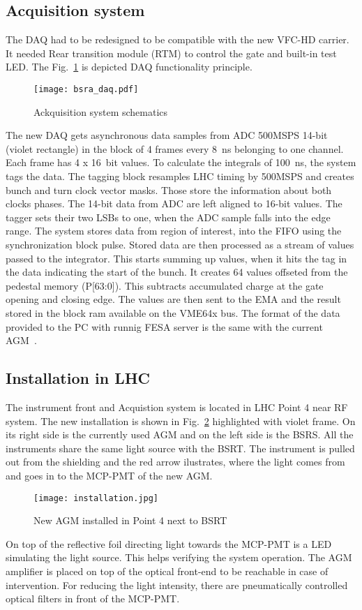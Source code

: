 \subsection{Acquisition system}
The DAQ had to be redesigned to be compatible with the new VFC-HD carrier. It
needed Rear transition module (RTM) to control the gate and built-in test LED.  
The Fig.~\ref{fig:bsra_daq} is depicted DAQ functionality principle. 
\begin{figure}[!tbh]
    \centering
    \texttt{[image: bsra\_daq.pdf]}
    \caption{Ackquisition system schematics}
    \label{fig:bsra_daq}
\end{figure}
The new DAQ gets asynchronous data samples from ADC 500MSPS 14-bit (violet
rectangle) in the block of 4 frames every \SI{8}{\nano s} belonging to one
channel. Each frame has 4 x \SI{16}{bit} values. To calculate the integrals of
\SI{100}{\nano\second}, the system tags the data. The tagging block resamples
LHC timing by 500MSPS and creates bunch and turn clock vector masks. Those
store the information about both clocks phases. The 14-bit data from ADC are
left aligned to 16-bit values. The tagger sets their two LSBs to one, when the
ADC sample falls into the edge range. The system stores data from region of
interest, into the FIFO using the synchronization block pulse. Stored data are
then processed as a stream of values passed to the integrator. This starts
summing up values, when it hits the tag in the data indicating the start of the
bunch. It creates 64 values offseted from the pedestal memory (P[63:0]). This
subtracts accumulated charge at the gate opening and closing edge. The values
are then sent to the EMA and the result stored in the block ram available on
the VME64x bus. The format of the data provided to the PC with runnig FESA
server is the same with the current AGM~\cite{my_thesis}.

\subsection{Installation in LHC}
The instrument front and Acquistion system is located in LHC Point 4 near RF
system. The new installation is shown in Fig.~\ref{fig:installation}
highlighted with violet frame. On its right side is the currently used AGM
and on the left side is the BSRS. All the instruments share the same light
source with the BSRT. The instrument is pulled out from the shielding and the
red arrow ilustrates, where the light comes from and goes in to the MCP-PMT of
the new AGM.
\begin{figure}[!tbh]
    \centering
    \texttt{[image: installation.jpg]}
    \caption{New AGM installed in Point 4 next to BSRT}
    \label{fig:installation}
\end{figure}
On top of the reflective foil directing light towards the MCP-PMT
is a LED simulating the light source. This helps verifying the system
operation. The AGM amplifier is placed on top of the optical front-end to be
reachable in case of intervention. For reducing the light intensity, there are
pneumatically controlled optical filters in front of the MCP-PMT. 

